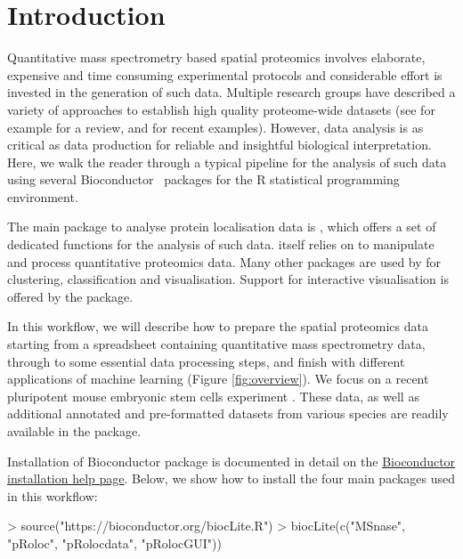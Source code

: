

\section*{Introduction}

Quantitative mass spectrometry based spatial proteomics involves
elaborate, expensive and time consuming experimental protocols and
considerable effort is invested in the generation of such data.
Multiple research groups have described a variety of approaches to
establish high quality proteome-wide datasets (see for example
\cite{Gatto:2010} for a review, and
\cite{hyper,Itzhak:2016,Jean_Beltran:2016} for recent
examples). However, data analysis is as critical as data production
for reliable and insightful biological interpretation. Here, we walk
the reader through a typical pipeline for the analysis of such data
using several Bioconductor~\cite{Huber:2015} packages for the R
statistical programming environment.

The main package to analyse protein localisation data is
, which offers a set of dedicated functions for the
analysis of such data.  itself relies on
 to manipulate and process quantitative proteomics
data. Many other packages are used by  for clustering,
classification and visualisation. Support for interactive
visualisation is offered by the  package.

In this workflow, we will describe how to prepare the spatial
proteomics data starting from a spreadsheet containing quantitative
mass spectrometry data, through to some essential data processing
steps, and finish with different applications of machine learning
(Figure \ref{fig:overview}). We focus on a recent pluripotent mouse
embryonic stem cells experiment \cite{hyper}. These data, as well as
additional annotated and pre-formatted datasets from various species
are readily available in the  package.

Installation of Bioconductor package is documented in detail on the
\href{http://bioconductor.org/install/#install-bioconductor-packages}{Bioconductor
  installation help page}. Below, we show how to install the four main
packages used in this workflow:

\begin{Schunk}
\begin{Sinput}
> source("https://bioconductor.org/biocLite.R")
> biocLite(c("MSnase", "pRoloc", "pRolocdata", "pRolocGUI"))
\end{Sinput}
\end{Schunk}


